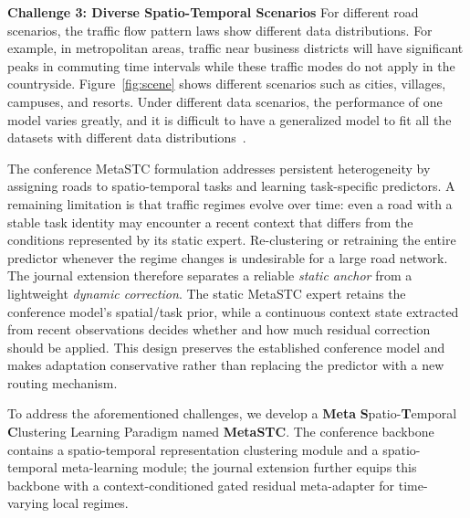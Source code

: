 \documentclass[lettersize,journal]{IEEEtran}
\begin{document}



\textbf{Challenge 3: Diverse Spatio-Temporal Scenarios}
For different road scenarios, the traffic flow pattern laws show different data distributions. For example, in metropolitan areas, traffic near business districts will have significant peaks in commuting time intervals while these traffic modes do not apply in the countryside. Figure~\ref{fig:scene} shows different scenarios such as cities, villages, campuses, and resorts. Under different data scenarios, the performance of one model varies greatly, and it is difficult to have a generalized model to fit all the datasets with different data distributions~\cite{survey}. 

\color{blue}
The conference MetaSTC formulation addresses persistent heterogeneity by assigning roads to spatio-temporal tasks and learning task-specific predictors. A remaining limitation is that traffic regimes evolve over time: even a road with a stable task identity may encounter a recent context that differs from the conditions represented by its static expert. Re-clustering or retraining the entire predictor whenever the regime changes is undesirable for a large road network. The journal extension therefore separates a reliable \emph{static anchor} from a lightweight \emph{dynamic correction}. The static MetaSTC expert retains the conference model's spatial/task prior, while a continuous context state extracted from recent observations decides whether and how much residual correction should be applied. This design preserves the established conference model and makes adaptation conservative rather than replacing the predictor with a new routing mechanism.

To address the aforementioned challenges, we develop a \textbf{Meta} \textbf{S}patio-\textbf{T}emporal \textbf{C}lustering Learning Paradigm named \textbf{MetaSTC}. The conference backbone contains a spatio-temporal representation clustering module and a spatio-temporal meta-learning module; the journal extension further equips this backbone with a context-conditioned gated residual meta-adapter for time-varying local regimes. 
\end{document}
